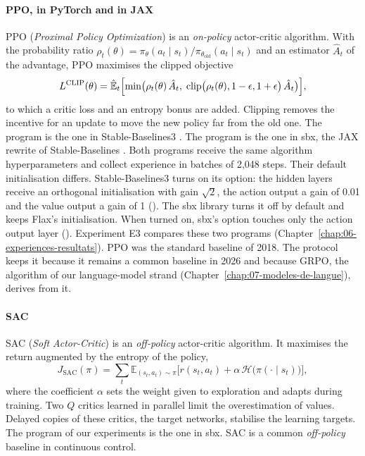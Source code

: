 \paragraph{PPO, in PyTorch and in JAX}
PPO (\emph{Proximal Policy Optimization}) \parencite{schulman2017ppo} is an \emph{on-policy}
actor-critic algorithm. With the probability ratio
$\rho_t(\theta) = \pi_\theta(a_t \mid s_t) / \pi_{\theta_\text{old}}(a_t \mid s_t)$ and an estimator
$\hat{A}_t$ of the advantage, PPO maximises the clipped objective
\begin{equation}
  L^{\text{CLIP}}(\theta) = \hat{\mathbb{E}}_t\Bigl[ \min\bigl( \rho_t(\theta)\, \hat{A}_t,\;
  \operatorname{clip}\bigl(\rho_t(\theta), 1 - \epsilon, 1 + \epsilon\bigr)\, \hat{A}_t \bigr) \Bigr],
\end{equation}
to which a critic loss and an entropy bonus are added. Clipping removes the incentive for an update to
move the new policy far from the old one. The program  is the one in
Stable-Baselines3 \parencite{raffin2021sb3}. The program  is the one in sbx, the JAX
rewrite of Stable-Baselines \parencite{raffin2023sbx,bradbury2018jax}. Both programs receive the
same algorithm hyperparameters and collect experience in batches of 2,048 steps. Their default
initialisation differs. Stable-Baselines3 turns on its  option: the hidden layers
receive an orthogonal initialisation with gain $\sqrt{2}$, the action output a gain of 0.01 and the
value output a gain of 1 (). The sbx library turns it off by
default and keeps Flax's initialisation. When turned on, sbx's option touches only the action output
layer (). Experiment E3 compares these two programs
(Chapter~\ref{chap:06-experiences-resultats}). PPO was the standard baseline of 2018. The protocol keeps it because it remains a
common baseline in 2026 and because GRPO, the algorithm of our language-model strand
(Chapter~\ref{chap:07-modeles-de-langue}), derives from it.

\paragraph{SAC}
SAC (\emph{Soft Actor-Critic}) \parencite{haarnoja2018sac} is an \emph{off-policy} actor-critic
algorithm. It maximises the return augmented by the entropy of the policy,
\begin{equation}
  J_{\text{SAC}}(\pi) = \sum_t \mathbb{E}_{(s_t, a_t) \sim \pi}\bigl[ r(s_t, a_t) + \alpha\, \mathcal{H}\bigl(\pi(\cdot \mid s_t)\bigr) \bigr],
\end{equation}
where the coefficient $\alpha$ sets the weight given to exploration and adapts during training. Two $Q$ critics learned
in parallel limit the overestimation of values. Delayed copies of these critics, the target networks,
stabilise the learning targets. The  program of our experiments is the one in sbx. SAC is a
common \emph{off-policy} baseline in continuous control.

